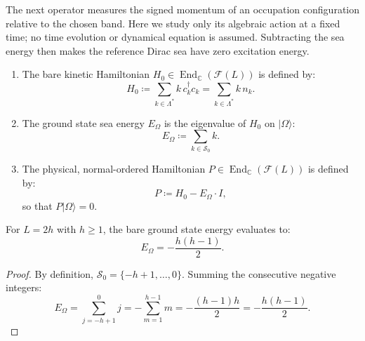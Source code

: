 \begin{definition}
The next operator measures the signed momentum of an occupation configuration relative to the chosen band. Here we study only its algebraic action at a fixed time; no time evolution or dynamical equation is assumed. Subtracting the sea energy then makes the reference Dirac sea have zero excitation energy.
\begin{enumerate}
    \item The bare kinetic Hamiltonian $H_0\in\operatorname{End}_{\mathbb C}(\mathcal F(L))$ is defined by:
    \begin{equation}
    H_0 \coloneqq \sum_{k \in \Lambda^*} k\, c_k^\dagger c_k = \sum_{k \in \Lambda^*} k\, n_k.
    \end{equation}
    \item The ground state sea energy $E_\Omega$ is the eigenvalue of $H_0$ on $|\Omega\rangle$:
    \begin{equation}
    E_\Omega \coloneqq \sum_{k \in \mathcal{S}_0} k.
    \end{equation}
    \item The physical, normal-ordered Hamiltonian $P\in\operatorname{End}_{\mathbb C}(\mathcal F(L))$ is defined by:
    \begin{equation}
    P \coloneqq H_0 - E_\Omega \cdot I,
    \end{equation}
    so that $P |\Omega\rangle = 0$.
\end{enumerate}
\end{definition}

\begin{lemma}
For $L = 2h$ with $h \ge 1$, the bare ground state energy evaluates to:
\begin{equation}
E_\Omega = -\frac{h(h-1)}{2}.
\end{equation}
\end{lemma}

\begin{proof}
By definition, $\mathcal{S}_0 = \{-h+1, \dots, 0\}$. Summing the consecutive negative integers:
\begin{equation}
E_\Omega = \sum_{j=-h+1}^0 j = - \sum_{m=1}^{h-1} m = - \frac{(h-1) h}{2} = -\frac{h(h-1)}{2}.
\end{equation}
\end{proof}


